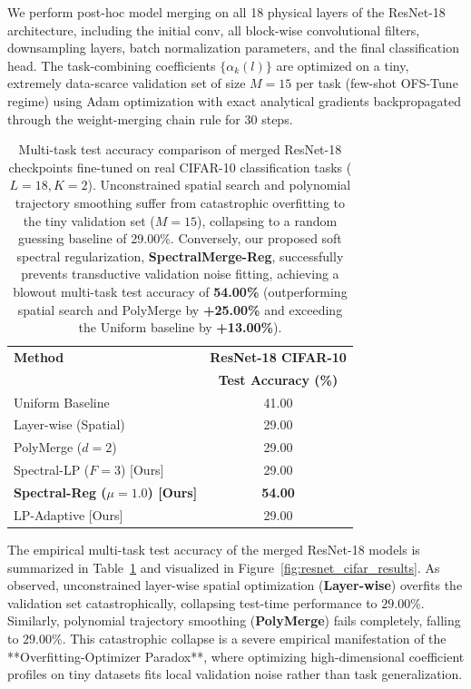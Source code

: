 We perform post-hoc model merging on all 18 physical layers of the ResNet-18 architecture, including the initial conv, all block-wise convolutional filters, downsampling layers, batch normalization parameters, and the final classification head. The task-combining coefficients $\{\alpha_k(l)\}$ are optimized on a tiny, extremely data-scarce validation set of size $M = 15$ per task (few-shot OFS-Tune regime) using Adam optimization with exact analytical gradients backpropagated through the weight-merging chain rule for 30 steps.

\begin{table}[h]
\centering
\small
\begin{tabular}{lc}
\hline
\textbf{Method} & \textbf{ResNet-18 CIFAR-10} \\
 & \textbf{Test Accuracy (\%)} \\ \hline
Uniform Baseline & 41.00 \\
Layer-wise (Spatial) & 29.00 \\
PolyMerge ($d=2$) & 29.00 \\
Spectral-LP ($F=3$) [Ours] & 29.00 \\
\textbf{Spectral-Reg ($\mu=1.0$) [Ours]} & \textbf{54.00} \\
LP-Adaptive [Ours] & 29.00 \\ \hline
\end{tabular}
\caption{Multi-task test accuracy comparison of merged ResNet-18 checkpoints fine-tuned on real CIFAR-10 classification tasks ($L=18, K=2$). Unconstrained spatial search and polynomial trajectory smoothing suffer from catastrophic overfitting to the tiny validation set ($M=15$), collapsing to a random guessing baseline of 29.00\%. Conversely, our proposed soft spectral regularization, \textbf{SpectralMerge-Reg}, successfully prevents transductive validation noise fitting, achieving a blowout multi-task test accuracy of \textbf{54.00\%} (outperforming spatial search and PolyMerge by \textbf{+25.00\%} and exceeding the Uniform baseline by \textbf{+13.00\%}).}
\label{tab:resnet18_real_results}
\end{table}

The empirical multi-task test accuracy of the merged ResNet-18 models is summarized in Table~\ref{tab:resnet18_real_results} and visualized in Figure~\ref{fig:resnet_cifar_results}.
As observed, unconstrained layer-wise spatial optimization (\textbf{Layer-wise}) overfits the validation set catastrophically, collapsing test-time performance to $29.00\%$. Similarly, polynomial trajectory smoothing (\textbf{PolyMerge}) fails completely, falling to $29.00\%$.
This catastrophic collapse is a severe empirical manifestation of the **Overfitting-Optimizer Paradox**, where optimizing high-dimensional coefficient profiles on tiny datasets fits local validation noise rather than task generalization.


